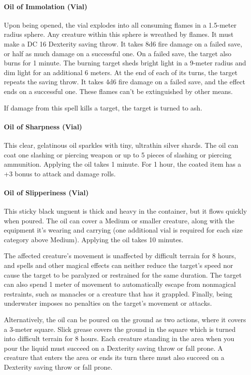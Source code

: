 \paragraph{Oil of Immolation (Vial)} %
    Upon being opened, the vial explodes into all consuming flames in a 1.5-meter radius sphere.
    Any creature within this sphere is wreathed by flames.
    It must make a DC 16 Dexterity saving throw.
    It takes 8d6 fire damage on a failed save, or half as much damage on a successful one.
    On a failed save, the target also burns for 1 minute.
    The burning target sheds bright light in a 9-meter radius and dim light for an additional 6 meters.
    At the end of each of its turns, the target repeats the saving throw.
    It takes 4d6 fire damage on a failed save, and the effect ends on a successful one.
    These flames can't be extinguished by other means.

    If damage from this spell kills a target, the target is turned to ash.
\paragraph{Oil of Sharpness (Vial)}
    This clear, gelatinous oil sparkles with tiny, ultrathin silver shards.
    The oil can coat one slashing or piercing weapon or up to 5 pieces of slashing or piercing ammunition.
    Applying the oil takes 1 minute.
    For 1 hour, the coated item has a +3 bonus to attack and damage rolls.
\paragraph{Oil of Slipperiness (Vial)} %
    This sticky black unguent is thick and heavy in the container, but it flows quickly when poured.
    The oil can cover a Medium or smaller creature, along with the equipment it's wearing and carrying (one additional vial is required for each size category above Medium).
    Applying the oil takes 10 minutes.

    The affected creature's movement is unaffected by difficult terrain for 8 hours, and spells and other magical effects can neither reduce the target's speed nor cause the target to be paralyzed or restrained for the same duration.
    The target can also spend 1 meter of movement to automatically escape from nonmagical restraints, such as manacles or a creature that has it grappled.
    Finally, being underwater imposes no penalties on the target's movement or attacks.

    Alternatively, the oil can be poured on the ground as two actions, where it covers a 3-meter square.
    Slick grease covers the ground in the square which is turned into difficult terrain for 8 hours.
    Each creature standing in the area when you pour the liquid must succeed on a Dexterity saving throw or fall prone.
    A creature that enters the area or ends its turn there must also succeed on a Dexterity saving throw or fall prone.
